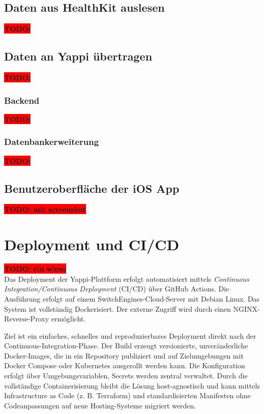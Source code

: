 \documentclass[12pt,a4paper]{report}
\newcommand{\todo}[1]{\colorbox{red}{\textbf{TODO: #1}}\\}
\begin{document}
\subsection{Daten aus HealthKit auslesen}
\todo{}

\subsection{Daten an Yappi übertragen}
\todo{}
\subsubsection{Backend}
\todo{}
\subsubsection{Datenbankerweiterung}
\todo{}

\subsection{Benutzeroberfläche der iOS App}
\todo{mit screenshot}


\section{Deployment und CI/CD}
\todo{ein wieso}

    Das Deployment der Yappi-Plattform erfolgt automatisiert mittels \textit{Continuous Integration/Continuous Deployment}
    (CI/CD) über GitHub Actions. Die Ausführung erfolgt auf einem SwitchEngines-Cloud-Server mit Debian Linux.
    Das System ist vollständig Dockerisiert. Der externe Zugriff wird durch einen NGINX-Reverse-Proxy ermöglicht.

    Ziel ist ein einfaches, schnelles und reproduzierbares Deployment direkt nach der Continuous-Integration-Phase.
    Der Build erzeugt versionierte, unveränderliche Docker-Images, die in ein Repository publiziert und auf
    Zielumgebungen mit Docker Compose oder Kubernetes ausgerollt werden kann. Die Konfiguration erfolgt über
    Umgebungsvariablen, Secrets werden zentral verwaltet. Durch die vollständige Containerisierung bleibt die Lösung
    host-agnostisch und kann mittels Infrastructure as Code (z. B. Terraform) und standardisierten Manifesten
    ohne Codeanpassungen auf neue Hosting-Systeme migriert werden.
\end{document}
